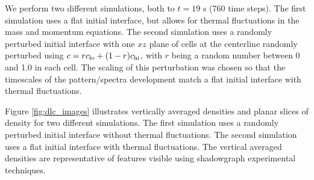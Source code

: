 \documentclass[final]{siamltex}
\begin{document}
We perform two different simulations, both to $t=19$ s (760 time steps).
The first simulation uses a flat initial interface, but allows for thermal fluctuations in the mass
and momentum equations.  The second simulation uses a randomly perturbed initial interface with one $xz$ plane 
of cells at the centerline randomly perturbed using $c = r c_{\rm lo} + (1-r) c_{\rm hi}$, with $r$ being a 
random number between 0 and 1.0 in each cell.  The scaling of this perturbation was chosen
so that the timescales of the pattern/spectra development match a flat initial interface with thermal fluctuations.

Figure \ref{fig:dlc_images} illustrates vertically averaged densities and planar slices
of density for two different simulations.  The first simulation uses a randomly perturbed
initial interface without thermal fluctuations.  The second simulation uses a flat initial
interface with thermal fluctuations.  The vertical averaged densities are representative
of features visible using shadowgraph experimental techniques.
\end{document}
